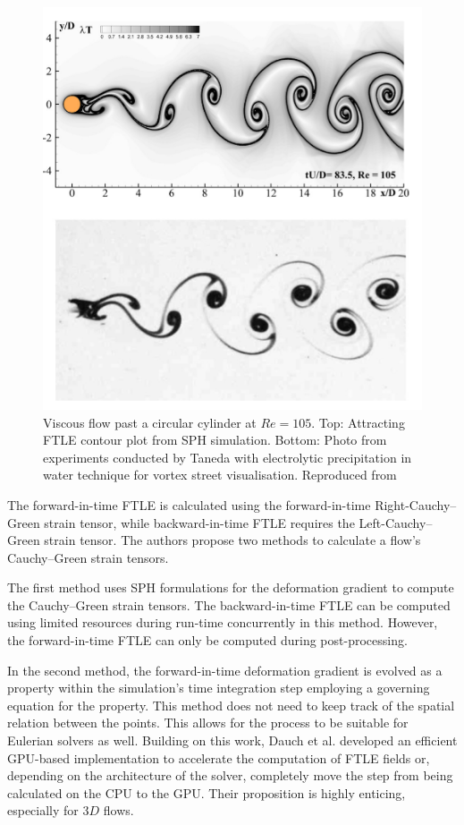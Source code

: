 \begin{figure}[H]
    \centering
    \includegraphics{Figures/research_papers/sun2016detection-fig-1.png}
    \caption{Viscous flow past a circular cylinder at $Re = 105$. Top: Attracting FTLE contour plot from SPH simulation. Bottom: Photo from experiments conducted by Taneda \parencite{taneda1977visual} with electrolytic precipitation in water technique for vortex street visualisation. Reproduced from \cite{sun2016detection}}
    \label{fig:sun2016detection-fig-1}
\end{figure}

The forward-in-time FTLE is calculated using the forward-in-time Right-Cauchy–Green strain tensor, while backward-in-time FTLE requires the Left-Cauchy–Green strain tensor.
The authors propose two methods to calculate a flow's Cauchy–Green strain tensors.

The first method uses SPH formulations for the deformation gradient to compute the Cauchy–Green strain tensors. The backward-in-time FTLE can be computed using limited resources during run-time concurrently in this method. However, the forward-in-time FTLE can only be computed during post-processing.

In the second method, the forward-in-time deformation gradient is evolved as a property within the simulation's time integration step employing a governing equation for the property. This method does not need to keep track of the spatial relation between the points. This allows for the process to be suitable for Eulerian solvers as well.
Building on this work, Dauch et al. \parencite{dauch2018highly} developed an efficient GPU-based implementation to accelerate the computation of FTLE fields or, depending on the architecture of the solver, completely move the step from being calculated on the CPU to the GPU. Their proposition is highly enticing, especially for $3D$ flows.

